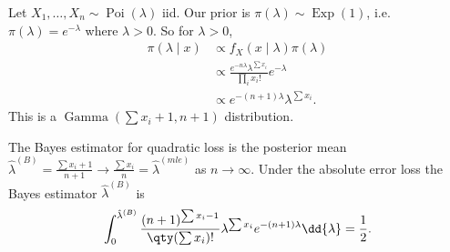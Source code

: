 \begin{example}
	Let $X_1, \dots, X_n \sim \operatorname{Poi}(\lambda)$ iid.
	Our prior is $\pi(\lambda) \sim \operatorname{Exp}(1)$, i.e. $\pi(\lambda) = e^{-\lambda}$ where $\lambda > 0$.
	So for $\lambda > 0$,
	\begin{align*}
		\pi(\lambda \mid x) &\propto f_X(x \mid \lambda) \pi(\lambda) \\
		&\propto \frac{e^{-n \lambda} \lambda^{\sum x_i}}{\prod_i x_i!} e^{-\lambda} \\
		&\propto e^{-(n+1) \lambda} \lambda^{\sum x_i}.
	\end{align*} 
	This is a $\operatorname{Gamma}(\sum x_i + 1, n + 1)$ distribution.

	The Bayes estimator for quadratic loss is the posterior mean $\hat{\lambda}^{(B)} = \frac{\sum x_i + 1}{n + 1} \to \frac{\sum x_i}{n} = \hat{\lambda}^{(mle)}$ as $n \to \infty$.
	Under the absolute error loss the Bayes estimator $\hat{\lambda}^{(B)}$ is 
	\begin{align*}
		\int_{0}^{\hat{\lambda}^{(B)}} \frac{(n+1)^{\sum x_i - 1}}{\qty(\sum x_i)!} \lambda^{\sum x_i} e^{-(n+1) \lambda} \dd{\lambda} = \frac{1}{2}.
	\end{align*} 
\end{example} 